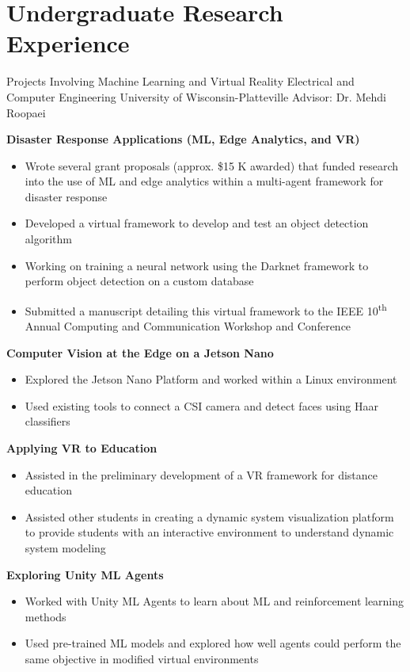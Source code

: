\section{Undergraduate Research Experience}

{Projects Involving Machine Learning and Virtual Reality}
{Electrical and Computer Engineering}
{University of Wisconsin-Platteville}
{Advisor: Dr. Mehdi Roopaei}
{
\textbf{Disaster Response Applications (ML, Edge Analytics, and VR)}
\begin{itemize}
    \item Wrote several grant proposals (approx. \$15 K awarded) that funded  research into the use of ML and edge analytics within a multi-agent framework for disaster response
    \item Developed a virtual framework to develop and test an object detection algorithm
    \item Working on training a neural network using the Darknet framework to perform object detection on a custom database
    \item Submitted a manuscript detailing this virtual framework to the IEEE 10\textsuperscript{th} Annual Computing and Communication Workshop and Conference
\end{itemize}
\textbf{Computer Vision at the Edge on a Jetson Nano}
\begin{itemize}
    \item Explored the Jetson Nano Platform and worked within a Linux environment
    \item Used existing tools to connect a CSI camera and detect faces using Haar classifiers
\end{itemize}
\textbf{Applying VR to Education}
\begin{itemize}
    \item Assisted in the preliminary development of a VR framework for distance education
    \item Assisted other students in creating a dynamic system visualization platform to provide students with an interactive environment to understand dynamic system modeling
\end{itemize}
\textbf{Exploring Unity ML Agents}
\begin{itemize}
    \item Worked with Unity ML Agents to learn about ML and reinforcement learning methods
    \item Used pre-trained ML models and explored how well agents could perform the same objective in modified virtual environments
\end{itemize}
}

